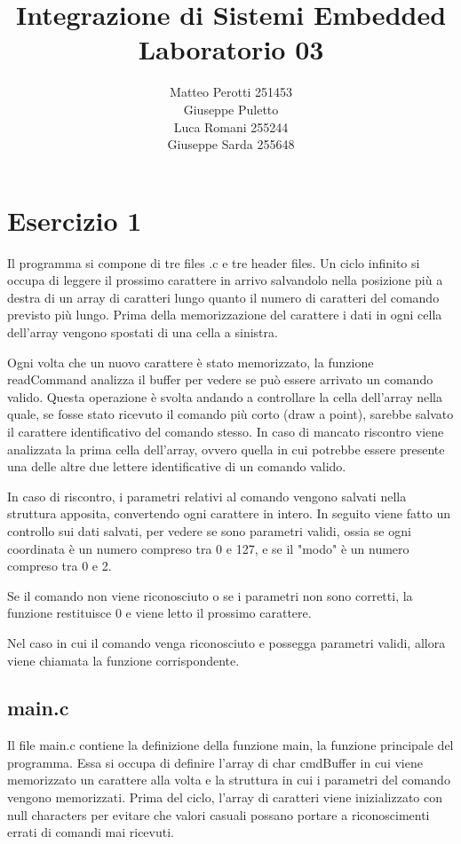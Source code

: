 \documentclass{article}
\title{Integrazione di Sistemi Embedded\\ Laboratorio 03}
\author{Matteo Perotti 251453\\ Giuseppe Puletto\\ Luca Romani 255244\\ Giuseppe Sarda 255648}
\begin{document}
\maketitle

\newpage

\section{Esercizio 1}
Il programma si compone di tre files .c e tre header files.
Un ciclo infinito si occupa di leggere il prossimo carattere in arrivo salvandolo nella posizione più a destra
di un array di caratteri lungo quanto il numero di caratteri del comando previsto più lungo. Prima della
memorizzazione del carattere i dati in ogni cella dell'array vengono spostati di una cella a sinistra.

Ogni volta che un nuovo carattere è stato memorizzato, la funzione readCommand analizza il buffer per vedere
se può essere arrivato un comando valido. Questa operazione è svolta andando a controllare la cella dell'array
nella quale, se fosse stato ricevuto il comando più corto (draw a point), sarebbe salvato il carattere
identificativo del comando stesso. In caso di mancato riscontro viene analizzata la prima cella dell'array, ovvero
quella in cui potrebbe essere presente una delle altre due lettere identificative di un comando valido.

In caso di riscontro, i parametri relativi al comando vengono salvati nella struttura apposita, convertendo ogni 
carattere in intero. In seguito viene fatto un controllo sui dati salvati, per vedere se sono parametri validi,
ossia se ogni coordinata è un numero compreso tra 0 e 127, e se il "modo" è un numero compreso tra 0 e 2.

Se il comando non viene riconosciuto o se i parametri non sono corretti, la funzione restituisce 0 e viene letto il
prossimo carattere.

Nel caso in cui il comando venga riconosciuto e possegga parametri validi, allora viene chiamata la funzione 
corrispondente.
	\subsection{main.c}
		Il file main.c contiene la definizione della funzione main, la funzione principale del programma. 
		Essa si occupa di definire l'array di char cmdBuffer in cui viene memorizzato un carattere alla volta e
		la struttura in cui i parametri del comando vengono memorizzati.
		Prima del ciclo, l'array di caratteri viene inizializzato con null characters per evitare che valori
		casuali possano portare a riconoscimenti errati di comandi mai ricevuti.
\end{document}
